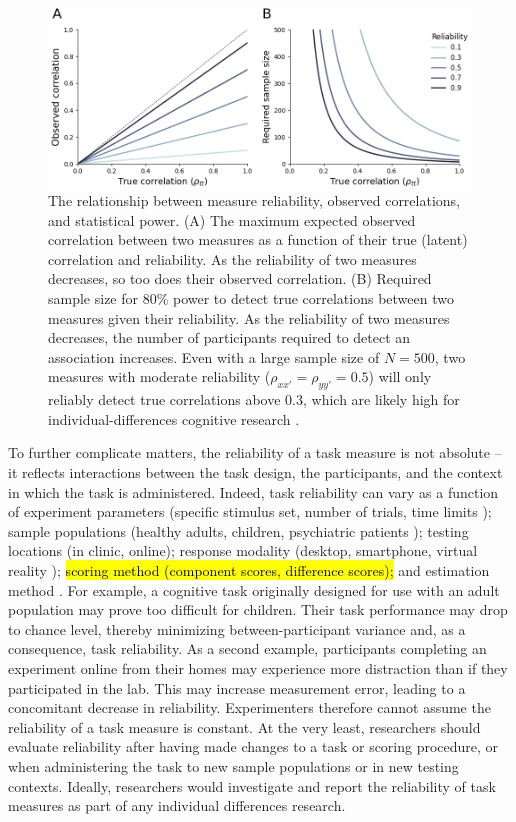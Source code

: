 \documentclass[a4paper,12pt]{article}
\begin{document}
\begin{figure}[tp]
    \centering
    \includegraphics[width=1.0\textwidth]{figures/fig01.png}
    \caption{\small The relationship between measure reliability, observed correlations, and statistical power. (A) The maximum expected observed correlation between two measures as a function of their true (latent) correlation and reliability. As the reliability of two measures decreases, so too does their observed correlation. (B) Required sample size for 80\% power to detect true correlations between two measures given their reliability. As the reliability of two measures decreases, the number of participants required to detect an association increases. Even with a large sample size of $N=500$, two measures with moderate reliability ($\rho_{xx'} = \rho_{yy'} = 0.5$) will only reliably detect true correlations above $0.3$, which are likely high for individual-differences cognitive research \cite{owens2021recalibrating}.}
    \label{fig:fig01}
\end{figure}

To further complicate matters, the reliability of a task measure is not absolute -- it reflects interactions between the task design, the participants, and the context in which the task is administered. Indeed, task reliability can vary as a function of experiment parameters (specific stimulus set, number of trials, time limits \cite{paap2016role, cooper2017role}); sample populations (healthy adults, children, psychiatric patients \cite{arnon2020current, cooper2017role}); testing locations (in clinic, online); response modality (desktop, smartphone, virtual reality \cite{pronk2022can, bruder2021reliability}); \hl{scoring method (component scores, difference scores);} and estimation method \cite{Rouder2019-am, haines2020learning, chen2021trial}. For example, a cognitive task originally designed for use with an adult population may prove too difficult for children. Their task performance may drop to chance level, thereby minimizing between-participant variance and, as a consequence, task reliability. As a second example, participants completing an experiment online from their homes may experience more distraction than if they participated in the lab. This may increase measurement error, leading to a concomitant decrease in reliability. Experimenters therefore cannot assume the reliability of a task measure is constant. At the very least, researchers should evaluate reliability after having made changes to a task or scoring procedure, or when administering the task to new sample populations or in new testing contexts. Ideally, researchers would investigate and report the reliability of task measures as part of any individual differences research.
\end{document}
